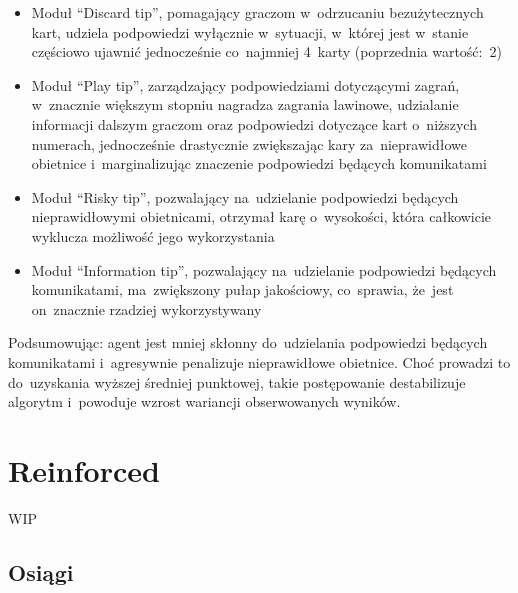\documentclass[declaration,shortabstract,inz]{iithesis}
\begin{document}
\begin{itemize}
	\item Moduł ``Discard tip'', pomagający graczom w~odrzucaniu bezużytecznych kart, udziela podpowiedzi wyłącznie w~sytuacji, w~której jest w~stanie częściowo ujawnić jednocześnie co~najmniej 4~karty (poprzednia wartość:~2)
	\item Moduł ``Play tip'', zarządzający podpowiedziami dotyczącymi zagrań, w~znacznie większym stopniu nagradza zagrania lawinowe, udzialanie informacji dalszym graczom oraz podpowiedzi dotyczące kart o~niższych numerach, jednocześnie drastycznie zwiększając kary za~nieprawidłowe obietnice i~marginalizując znaczenie podpowiedzi będących komunikatami
	\item Moduł ``Risky tip'', pozwalający na~udzielanie podpowiedzi będących nieprawidłowymi obietnicami, otrzymał karę o~wysokości, która całkowicie wyklucza możliwość jego wykorzystania
	\item Moduł ``Information tip'', pozwalający na~udzielanie podpowiedzi będących komunikatami, ma~zwiększony pułap jakościowy, co~sprawia, że~jest on~znacznie rzadziej wykorzystywany
\end{itemize}

Podsumowując: agent jest mniej skłonny do~udzielania podpowiedzi będących komunikatami i~agresywnie penalizuje nieprawidłowe obietnice. Choć prowadzi to do~uzyskania wyższej średniej punktowej, takie postępowanie destabilizuje algorytm i~powoduje wzrost wariancji obserwowanych wyników.

\section{Reinforced}

WIP

\subsection*{Osiągi}

\end{document}
